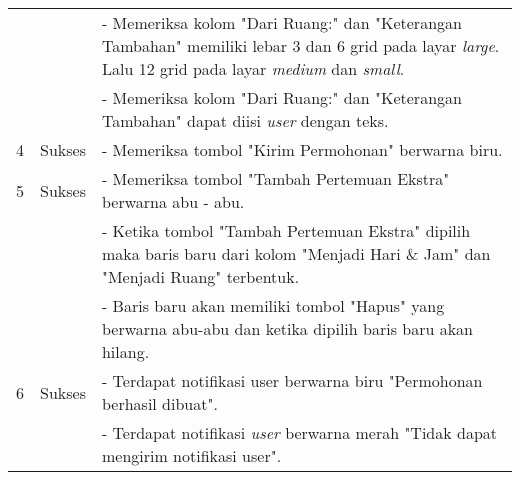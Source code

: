 \begin{table}[H]
\begin{tabular}{|c| c| p{}|}
			&& - Memeriksa kolom "Dari Ruang:" dan "Keterangan Tambahan" memiliki lebar 3 dan 6 grid pada layar \textit{large}. Lalu 12 grid pada layar \textit{medium} dan \textit{small}.\\
			&& - Memeriksa kolom "Dari Ruang:" dan "Keterangan Tambahan" dapat diisi \textit{user} dengan teks.\\
			\hline
			4 & Sukses & - Memeriksa tombol "Kirim Permohonan" berwarna biru.\\			
			\hline
			5 & Sukses & - Memeriksa tombol "Tambah Pertemuan Ekstra" berwarna abu - abu.\\
			&& - Ketika tombol "Tambah Pertemuan Ekstra" dipilih maka baris baru dari kolom "Menjadi Hari \& Jam" dan "Menjadi Ruang" terbentuk.\\
			&& - Baris baru akan memiliki tombol "Hapus" yang berwarna abu-abu dan ketika dipilih baris baru akan hilang.\\
			\hline
			6 & Sukses & - Terdapat notifikasi user berwarna biru "Permohonan berhasil dibuat".\\
			&&- Terdapat notifikasi \textit{user} berwarna merah "Tidak dapat mengirim notifikasi user".\\				
			\bottomrule		
		\end{tabular} 
\end{table}

